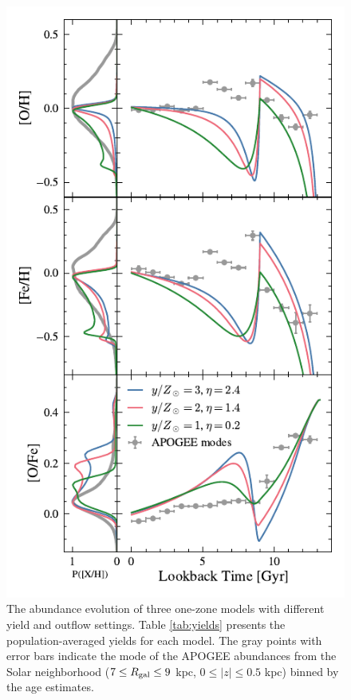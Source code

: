 \documentclass[twocolumn,twocolappendix,linenumbers]{aastex631}
\begin{document}
\begin{figure}
    \centering
    \includegraphics{figures/yield_outflow.pdf}
    \caption{The abundance evolution of three one-zone models with different yield and outflow settings. Table \ref{tab:yields} presents the population-averaged yields for each model. The gray points with error bars indicate the mode of the APOGEE abundances from the Solar neighborhood ($7\leq R_{\rm gal}\leq 9$ kpc, $0\leq|z|\leq0.5$ kpc) binned by the \citet{leung_variational_2023} age estimates.}
    \label{fig:yield-outflow}
\end{figure}
\end{document}
